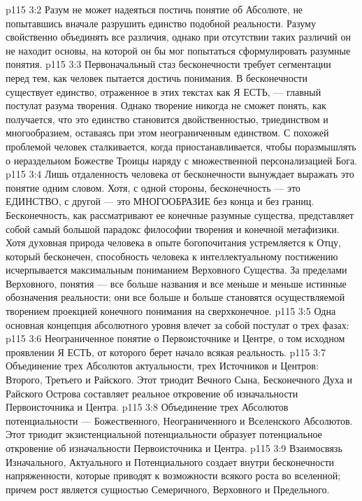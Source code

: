 \vs p115 3:2 Разум не может надеяться постичь понятие об Абсолюте, не попытавшись вначале разрушить единство подобной реальности. Разуму свойственно объединять все различия, однако при отсутствии таких различий он не находит основы, на которой он бы мог попытаться сформулировать разумные понятия.
\vs p115 3:3 Первоначальный стаз бесконечности требует сегментации перед тем, как человек пытается достичь понимания. В бесконечности существует единство, отраженное в этих текстах как Я ЕСТЬ, --- главный постулат разума творения. Однако творение никогда не сможет понять, как получается, что это единство становится двойственностью, триединством и многообразием, оставаясь при этом неограниченным единством. С похожей проблемой человек сталкивается, когда приостанавливается, чтобы поразмышлять о нераздельном Божестве Троицы наряду с множественной персонализацией Бога.
\vs p115 3:4 Лишь отдаленность человека от бесконечности вынуждает выражать это понятие одним словом. Хотя, с одной стороны, бесконечность --- это ЕДИНСТВО, с другой --- это МНОГООБРАЗИЕ без конца и без границ. Бесконечность, как рассматривают ее конечные разумные существа, представляет собой самый большой парадокс философии творения и конечной метафизики. Хотя духовная природа человека в опыте богопочитания устремляется к Отцу, который бесконечен, способность человека к интеллектуальному постижению исчерпывается максимальным пониманием Верховного Существа. За пределами Верховного, понятия --- все больше названия и все меньше и меньше истинные обозначения реальности; они все больше и больше становятся осуществляемой творением проекцией конечного понимания на сверхконечное.
\vs p115 3:5 \pc Одна основная концепция абсолютного уровня влечет за собой постулат о трех фазах:
\vs p115 3:6 \bibnobreakspace {} Неограниченное понятие о Первоисточнике и Центре, о том исходном проявлении Я ЕСТЬ, от которого берет начало всякая реальность.
\vs p115 3:7 \bibnobreakspace {} Объединение трех Абсолютов актуальности, трех Источников и Центров: Второго, Третьего и Райского. Этот триодит Вечного Сына, Бесконечного Духа и Райского Острова составляет реальное откровение об изначальности Первоисточника и Центра.
\vs p115 3:8 \bibnobreakspace {} Объединение трех Абсолютов потенциальности --- Божественного, Неограниченного и Вселенского Абсолютов. Этот триодит экзистенциальной потенциальности образует потенциальное откровение об изначальности Первоисточника и Центра.
\vs p115 3:9 \pc Взаимосвязь Изначального, Актуального и Потенциального создает внутри бесконечности напряженности, которые приводят к возможности всякого роста во вселенной; причем рост является сущностью Семеричного, Верховного и Предельного.
